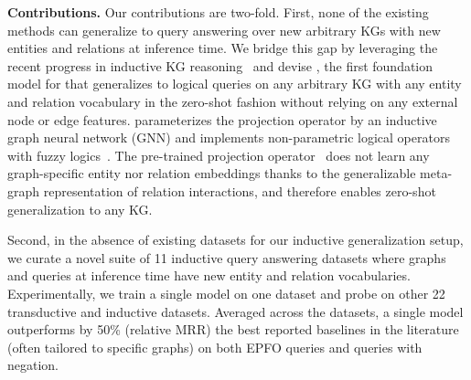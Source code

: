 \textbf{Contributions.} 
Our contributions are two-fold. First, none of the existing \clqa methods can generalize to query answering over new arbitrary KGs with new entities and relations at inference time. 
We bridge this gap by leveraging the recent progress in inductive KG reasoning~\citep{ultra,isdea} and devise \method, the first %
foundation model for \clqa that generalizes to logical queries on any arbitrary KG with any entity and relation vocabulary in the zero-shot fashion without relying on any external node or edge features. 
\method parameterizes the projection operator by an inductive graph neural network (GNN) and implements non-parametric logical operators with fuzzy logics~\citep{vankrieken_fuzzy}.
The pre-trained projection operator~\citep{ultra} does not learn any graph-specific entity nor relation embeddings thanks to the %
generalizable meta-graph representation of relation interactions, and %
therefore enables zero-shot generalization to any KG.


Second, in the absence of existing datasets for our inductive generalization setup,
we curate a novel suite of 11 inductive query answering datasets where graphs and queries at inference time  have new entity and relation vocabularies.
Experimentally, we train a single \method model on one dataset and probe on other 22 transductive and inductive datasets.
Averaged across the datasets, a single \method model outperforms by 50\% (relative MRR) the best reported baselines in the literature (often tailored to specific graphs) on both EPFO queries and queries with negation.
